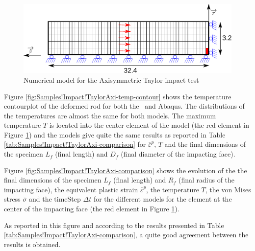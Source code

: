 \begin{figure}[h]
\begin{centering}
\includegraphics[width=0.75\columnwidth]{Figures/TaylorAxi}
\par\end{centering}
\caption{Numerical model for the Axisymmetric Taylor impact test\label{fig:Samples!Impact!TaylorAxi}}
\end{figure}

Figure \ref{fig:Samples!Impact!TaylorAxi-temp-contour} shows the
temperature contourplot of the deformed rod for both the \DynELA~and
Abaqus. The distributions of the temperatures are almost the same
for both models. The maximum temperature $T$ is located into the
center element of the model (the red element in Figure \ref{fig:Samples!Impact!TaylorAxi})
and the models give quite the same results as reported in Table \ref{tab:Samples!Impact!TaylorAxi-comparison}
for $\overline{\varepsilon}^{p}$, $T$ and the final dimensions of
the specimen $L_{f}$ (final length) and $D_{f}$ (final diameter
of the impacting face). 

Figure \ref{fig:Samples!Impact!TaylorAxi-comparison} shows the evolution
of the the final dimensions of the specimen $L_{f}$ (final length)
and $R_{f}$ (final radius of the impacting face), the equivalent
plastic strain $\overline{\varepsilon}^{p}$, the temperature $T$,
the von Mises stress $\overline{\sigma}$ and the timeStep $\Delta t$
for the different models for the element at the center of the impacting
face (the red element in Figure \ref{fig:Samples!Impact!TaylorAxi}). 

As reported in this figure and according to the results presented
in Table \ref{tab:Samples!Impact!TaylorAxi-comparison}, a quite good
agreement between the results is obtained.


